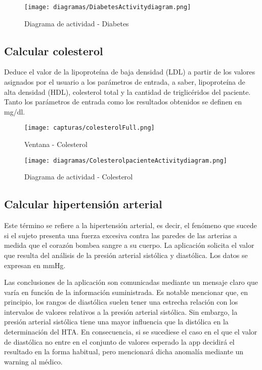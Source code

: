 \documentclass[11pt,spanish,
		listoftables,listoffigures]
		{tfgplantilla}
\begin{document}
\begin{figure}[H]
\centering
\texttt{[image: diagramas/DiabetesActivitydiagram.png]}
\caption{Diagrama de actividad - Diabetes}
\end{figure}

\subsection {Calcular colesterol}

Deduce el valor de la lipoproteína de baja densidad (LDL) a partir de los valores asignados por el usuario a los parámetros de entrada, a saber, lipoproteína de alta densidad (HDL), colesterol total y la cantidad de triglicéridos del paciente.
Tanto los parámetros de entrada como los resultados obtenidos se definen en mg/dl. 

\begin{figure}[H]
\centering
\texttt{[image: capturas/colesterolFull.png]}
\caption{Ventana - Colesterol}
\end{figure}

\begin{figure}[H]
\centering
\texttt{[image: diagramas/ColesterolpacienteActivitydiagram.png]}
\caption{Diagrama de actividad - Colesterol}
\end{figure}

\subsection {Calcular hipertensión arterial}

Este término se refiere a la hipertensión arterial, es decir, el fenómeno que sucede si el sujeto presenta una fuerza excesiva contra las paredes de las arterias a medida que el corazón bombea sangre a su cuerpo.
La aplicación solicita el valor que resulta del análisis de la presión arterial sistólica y diastólica. Los datos se expresan en mmHg.

Las conclusiones de la aplicación son comunicadas mediante un mensaje claro que varía en función de la información suministrada.
Es notable mencionar que, en principio, los rangos de diastólica suelen tener una estrecha relación con los intervalos de valores relativos a la presión arterial sistólica. Sin embargo, la presión arterial sistólica tiene una mayor influencia que la distólica en la determinación del HTA. En consecuencia, si se sucediese el caso en el que el valor de diastólica no entre en el conjunto de valores esperado la app decidirá el resultado en la forma habitual, pero mencionará dicha anomalía mediante un warning al médico.
\end{document}
